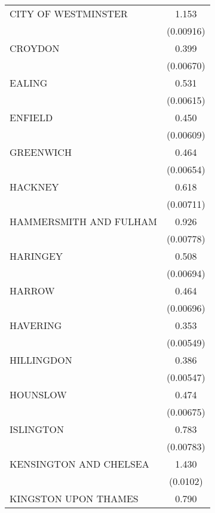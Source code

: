 {\begin{longtable}{l*{1}{c}}
\addlinespace
CITY OF WESTMINSTER &       1.153\sym{***}\\
                    &   (0.00916)         \\
\addlinespace
CROYDON             &       0.399\sym{***}\\
                    &   (0.00670)         \\
\addlinespace
EALING              &       0.531\sym{***}\\
                    &   (0.00615)         \\
\addlinespace
ENFIELD             &       0.450\sym{***}\\
                    &   (0.00609)         \\
\addlinespace
GREENWICH           &       0.464\sym{***}\\
                    &   (0.00654)         \\
\addlinespace
HACKNEY             &       0.618\sym{***}\\
                    &   (0.00711)         \\
\addlinespace
HAMMERSMITH AND FULHAM&       0.926\sym{***}\\
                    &   (0.00778)         \\
\addlinespace
HARINGEY            &       0.508\sym{***}\\
                    &   (0.00694)         \\
\addlinespace
HARROW              &       0.464\sym{***}\\
                    &   (0.00696)         \\
\addlinespace
HAVERING            &       0.353\sym{***}\\
                    &   (0.00549)         \\
\addlinespace
HILLINGDON          &       0.386\sym{***}\\
                    &   (0.00547)         \\
\addlinespace
HOUNSLOW            &       0.474\sym{***}\\
                    &   (0.00675)         \\
\addlinespace
ISLINGTON           &       0.783\sym{***}\\
                    &   (0.00783)         \\
\addlinespace
KENSINGTON AND CHELSEA&       1.430\sym{***}\\
                    &    (0.0102)         \\
\addlinespace
KINGSTON UPON THAMES&       0.790\sym{***}\\

\end{longtable}}
